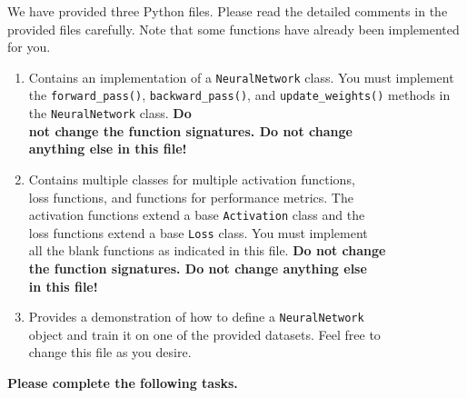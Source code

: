 \documentclass[12pt]{article}
\begin{document}
We have provided three Python files. Please read the detailed comments in the provided files carefully. Note that some functions have already been implemented for you.
%
\begin{enumerate}
    \item {} Contains an implementation of a \verb+NeuralNetwork+ class. You \makebox[4cm][l]{}  must implement the \verb+forward_pass()+,  \verb+backward_pass()+, and \makebox[4cm][l]{} \verb+update_weights()+  methods in the \verb+NeuralNetwork+ class. {\bf Do \\ \makebox[4cm][l]{} not change the  function signatures. Do not change \\ \makebox[4cm][l]{} anything else in this file!}

    \item {} Contains multiple classes for multiple activation functions, \\ \makebox[4cm][l]{} loss functions, and functions for performance metrics. The \\ \makebox[4cm][l]{}  activation functions extend a base \texttt{Activation} class and the \\ \makebox[4cm][l]{}  loss functions extend a base \texttt{Loss} class. You must implement \\ \makebox[4cm][l]{}  all the blank functions as indicated in this file. {\bf Do not change \\ \makebox[4cm][l]{} the  function signatures. Do not change anything else \\ \makebox[4cm][l]{} in this file!}

    \item {} Provides a demonstration of how to define a \verb+NeuralNetwork+ \\ \makebox[4cm][l]{} object and train it on one of the provided datasets.  Feel free to \\ \makebox[4cm][l]{} change this file as you desire.
\end{enumerate}

{\bf Please complete the following tasks.}
\end{document}
